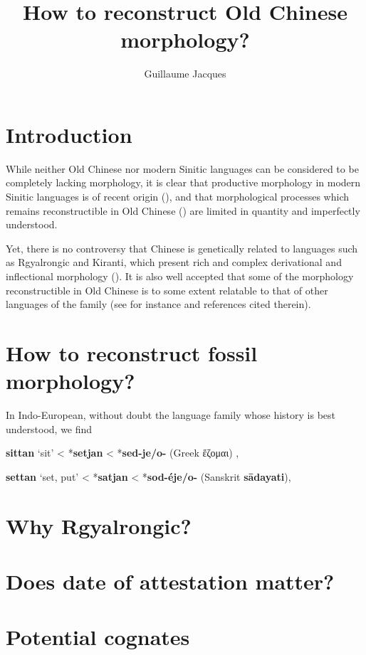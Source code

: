 \documentclass[oneside,a4paper,11pt]{article}
\newcommand{\ipa}[1]{\textbf{{\phon\mbox{#1}}}} %
\newcommand{\grec}[1]{{\mleccha #1}}
\begin{document}
\title{How to reconstruct Old Chinese morphology?}
\author{Guillaume Jacques}
\maketitle

\section*{Introduction}
While neither Old Chinese nor modern Sinitic languages can be considered to be completely lacking morphology, it is clear that productive morphology in modern Sinitic languages is of recent origin (\citealt{arcodia15typology}), and that morphological processes which remains reconstructible in Old Chinese (\citealt{sagart99roc}) are limited in quantity and imperfectly understood.

Yet, there is no controversy that Chinese is genetically related to languages such as Rgyalrongic and Kiranti, which present rich and complex derivational and inflectional morphology (\citealt{jacques13harmonization}). It is also well accepted that some of the morphology reconstructible in Old Chinese is to some extent relatable to that of other languages of the family (see for instance \citealt{sagart12sprefix} and references cited therein). 
 

\section{How to reconstruct fossil morphology?} 
In Indo-European, without doubt the language family whose history is best understood, we find 

\ipa{sittan} `sit' < *\ipa{setjan} < *\ipa{sed-je/o-} (Greek \grec{ἕζομαι})
\citet[434]{kroonen13dict}, \citet[514, n.7]{liv}

\ipa{settan} `set, put' < *\ipa{satjan} < *\ipa{sod-éje/o-} (Sanskrit \ipa{sādayati}), \citet[427]{kroonen13dict}



\section{Why Rgyalrongic?}

\citet{gong17xingtaixue}
\section{Does date of attestation matter?}

\section{Potential cognates}
\end{document}
